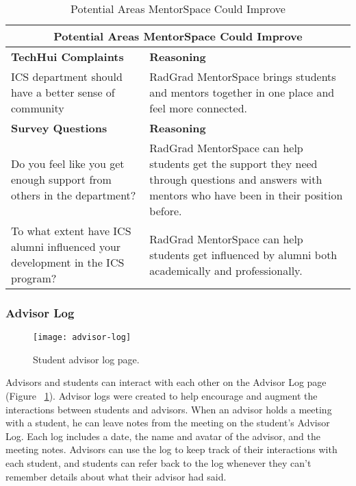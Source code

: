 \begin{table}[htbp!]
\centering
\begin{tabular}{  |p{4cm}|p{12cm}| } 
\hline
 \multicolumn{2}{|c|}{Potential Areas MentorSpace Could Improve}\\
  \hline
 \textbf{TechHui Complaints} & \textbf{Reasoning} \\ 
  \hline
  ICS department should have a better sense of community & RadGrad MentorSpace brings students and mentors together in one place and feel more connected.\\
  \hline
 \textbf{Survey Questions} & \textbf{Reasoning} \\ 
  \hline
  Do you feel like you get enough support from others in the department? & RadGrad MentorSpace can help students get the support they need through questions and answers with mentors who have been in their position before. \\
  \hline
    To what extent have ICS alumni influenced your development in the ICS program? & RadGrad MentorSpace can help students get influenced by alumni both academically and professionally. \\
  \hline
\end{tabular}
 \caption{Potential Areas MentorSpace Could Improve}
\end{table}

\subsubsection{Advisor Log}

\begin{figure}[htbp!]
\centering
\texttt{[image: advisor-log]}
\caption{Student advisor log page.}
\label{advisor-log}
\end{figure}
Advisors and students can interact with each other on the Advisor Log page (Figure ~\ref{advisor-log}). Advisor logs were created to help encourage and augment the interactions between students and advisors. When an advisor holds a meeting with a student, he can leave notes from the meeting on the student's Advisor Log. Each log includes a date, the name and avatar of the advisor, and the meeting notes. Advisors can use the log to keep track of their interactions with each student, and students can refer back to the log whenever they can't remember details about what their advisor had said. 

